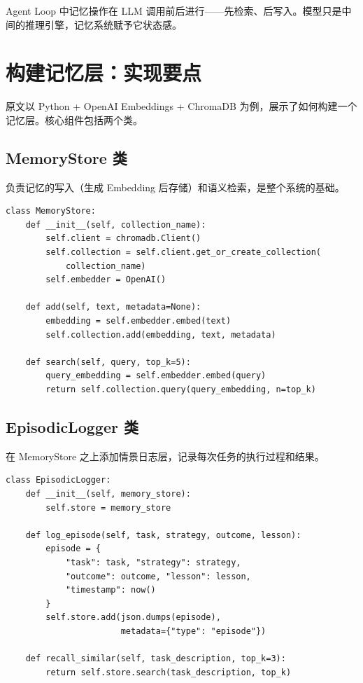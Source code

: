 \documentclass[a4paper]{article}
\begin{document}
Agent Loop 中记忆操作在 LLM 调用前后进行——先检索、后写入。模型只是中间的推理引擎，记忆系统赋予它状态感。

\section{构建记忆层：实现要点}

原文以 Python + OpenAI Embeddings + ChromaDB 为例，展示了如何构建一个记忆层。核心组件包括两个类。

\subsection{MemoryStore 类}

负责记忆的写入（生成 Embedding 后存储）和语义检索，是整个系统的基础。

\begin{lstlisting}[caption={MemoryStore 核心接口（伪代码）}]
class MemoryStore:
    def __init__(self, collection_name):
        self.client = chromadb.Client()
        self.collection = self.client.get_or_create_collection(
            collection_name)
        self.embedder = OpenAI()

    def add(self, text, metadata=None):
        embedding = self.embedder.embed(text)
        self.collection.add(embedding, text, metadata)

    def search(self, query, top_k=5):
        query_embedding = self.embedder.embed(query)
        return self.collection.query(query_embedding, n=top_k)
\end{lstlisting}

\subsection{EpisodicLogger 类}

在 MemoryStore 之上添加情景日志层，记录每次任务的执行过程和结果。

\begin{lstlisting}[caption={EpisodicLogger 核心接口（伪代码）}]
class EpisodicLogger:
    def __init__(self, memory_store):
        self.store = memory_store

    def log_episode(self, task, strategy, outcome, lesson):
        episode = {
            "task": task, "strategy": strategy,
            "outcome": outcome, "lesson": lesson,
            "timestamp": now()
        }
        self.store.add(json.dumps(episode),
                       metadata={"type": "episode"})

    def recall_similar(self, task_description, top_k=3):
        return self.store.search(task_description, top_k)
\end{lstlisting}
\end{document}
